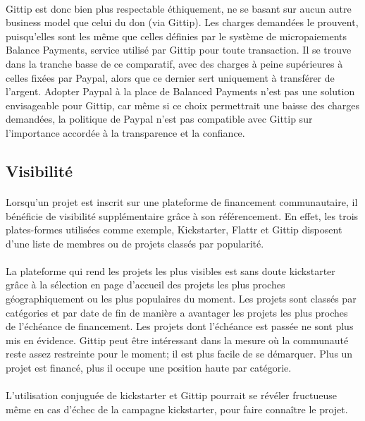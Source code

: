 \paragraph{}
Gittip est donc bien plus respectable éthiquement, ne se basant sur aucun autre
business model que celui du don (via Gittip). Les charges demandées le
prouvent, puisqu'elles sont les même que celles définies par le système de
micropaiements Balance Payments, service utilisé par Gittip pour toute
transaction. Il se trouve dans la tranche basse de ce comparatif, avec des
charges à peine supérieures à celles fixées par Paypal, alors que ce dernier
sert uniquement à transférer de l'argent. Adopter Paypal à la place de Balanced
Payments n'est pas une solution envisageable pour Gittip, car même si ce choix
permettrait une baisse des charges demandées, la politique de Paypal n'est pas
compatible avec Gittip sur l'importance accordée à la transparence et la
confiance.

\subsection{Visibilité}

\paragraph{}
Lorsqu'un projet est inscrit sur une plateforme de financement communautaire,
il bénéficie de visibilité supplémentaire grâce à son référencement. En effet,
les trois plates-formes utilisées comme exemple, Kickstarter, Flattr et Gittip
disposent d'une liste de membres ou de projets classés par popularité.

\paragraph{}
La plateforme qui rend les projets les plus visibles est sans doute kickstarter
grâce à la sélection en page d'accueil des projets les plus proches
géographiquement ou les plus populaires du moment. Les projets sont classés par
catégories et par date de fin de manière a avantager les projets les plus
proches de l'échéance de financement. Les projets dont l'échéance est passée ne
sont plus mis en évidence.
Gittip peut être intéressant dans la mesure où la communauté reste assez
restreinte pour le moment; il est plus facile de se démarquer. Plus un projet
est financé, plus il occupe une position haute par catégorie.

\paragraph{}
L'utilisation conjuguée de kickstarter et Gittip pourrait se révéler fructueuse
même en cas d'échec de la campagne kickstarter, pour faire connaître le projet.

